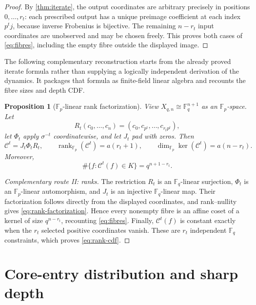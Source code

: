 \documentclass[10pt,a4paper]{amsart}
\newtheorem{proposition}[theorem]{Proposition}
\theoremstyle{definition}
\theoremstyle{remark}
\newcommand{\F}{\mathbb F}
\begin{document}
\begin{proof}
By \cref{thm:iterate}, the output coordinates are arbitrary precisely in
positions $0,\ldots,r_t$: each prescribed output has a unique preimage
coefficient at each index $p^tj$, because inverse Frobenius is bijective.
The remaining $n-r_t$ input coordinates are unobserved and may be chosen
freely.  This proves both cases of \eqref{eq:fibres}, including the empty
fibre outside the displayed image.
\end{proof}

The following complementary reconstruction starts from the already proved
iterate formula rather than supplying a logically independent derivation of
the dynamics.  It packages that formula as finite-field linear algebra and
recounts the fibre sizes and depth CDF.

\begin{proposition}[$\F_p$-linear rank factorization]
\label{prop:rank-route}
View $X_{q,n}\cong\F_q^{n+1}$ as an $\F_p$-space.  Let
\[
 R_t(c_0,\ldots,c_n)=(c_0,c_{p^t},\ldots,c_{r_tp^t}),
\]
let $\Phi_t$ apply $\sigma^{-t}$ coordinatewise, and let $J_t$ pad with
zeros.  Then
\begin{equation}
 \mathcal C^t=J_t\Phi_tR_t,
 \qquad
 \operatorname{rank}_{\F_p}(\mathcal C^t)=a(r_t+1),
 \qquad
 \dim_{\F_p}\ker(\mathcal C^t)=a(n-r_t).
 \label{eq:rank-factorization}
\end{equation}
Moreover,
\begin{equation}
 \#\{f:\mathcal C^t(f)\in K\}=q^{n+1-r_t}.
 \label{eq:rank-cdf}
\end{equation}
\end{proposition}

\begin{proof}[Complementary route II: ranks]
The restriction $R_t$ is an $\F_q$-linear surjection,
$\Phi_t$ is an $\F_p$-linear automorphism, and $J_t$ is an injective
$\F_q$-linear map.  Their factorization follows directly from the displayed
coordinates, and rank--nullity gives \eqref{eq:rank-factorization}.  Hence
every nonempty fibre is an affine coset of a kernel of size $q^{n-r_t}$,
recounting \eqref{eq:fibres}.  Finally,
$\mathcal C^t(f)$ is constant exactly when the $r_t$ selected positive
coordinates vanish.  These are $r_t$ independent $\F_q$ constraints, which
proves \eqref{eq:rank-cdf}.
\end{proof}

\section{Core-entry distribution and sharp depth}
\label{sec:depth}
\end{document}

